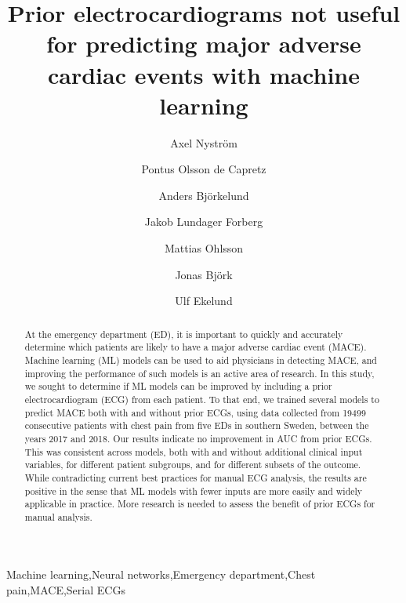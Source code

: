 \documentclass[preprint]{elsarticle}
\begin{document}
\begin{frontmatter}

\title{Prior electrocardiograms not useful for predicting major adverse cardiac events with machine learning}


\author[inst1]{Axel Nystr\"{o}m}
\author[inst2,inst3]{Pontus Olsson de Capretz}
\author[inst4]{Anders Bj\"{o}rkelund}
\author[inst3,inst5]{Jakob Lundager Forberg}
\author[inst4]{Mattias Ohlsson}
\author[inst1,inst6]{Jonas Bj\"{o}rk}
\author[inst2,inst3]{Ulf Ekelund}


            





\begin{abstract}
At the emergency department (ED), it is important to quickly and accurately determine which patients are likely to have a major adverse cardiac event (MACE). Machine learning (ML) models can be used to aid physicians in detecting MACE, and improving the performance of such models is an active area of research. In this study, we sought to determine if ML models can be improved by including a prior electrocardiogram (ECG) from each patient. To that end, we trained several models to predict MACE both with and without prior ECGs, using data collected from 19499 consecutive patients with chest pain from five EDs in southern Sweden, between the years 2017 and 2018. Our results indicate no improvement in AUC from prior ECGs. This was consistent across models, both with and without additional clinical input variables, for different patient subgroups, and for different subsets of the outcome. While contradicting current best practices for manual ECG analysis, the results are positive in the sense that ML models with fewer inputs  are more easily and widely applicable in practice. More research is needed to assess the benefit of prior ECGs for manual analysis.
\end{abstract}

\begin{keyword}
Machine learning\sep Neural networks\sep Emergency department\sep Chest pain\sep MACE\sep Serial ECGs
\end{keyword}

\end{frontmatter}
\end{document}
